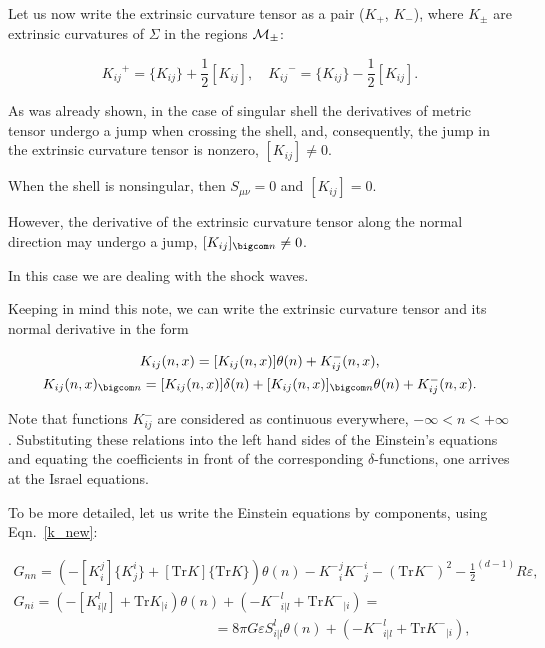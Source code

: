 Let us now write the extrinsic curvature tensor as a pair ($K_+$, $K_-$), where $K_\pm$ are extrinsic curvatures of $\Sigma$ in the regions ${\cal M}_{\pm}$:

$$

{K_{ij}}^+=\{K_{ij}\}+\frac{1}{2}[K_{ij}],

\quad 

{K_{ij}}^-=\{K_{ij}\}-\frac{1}{2}[K_{ij}].

$$

As was already shown, in the case of singular shell the derivatives of metric tensor undergo a jump when crossing the shell, and, consequently, the jump in the extrinsic curvature tensor is nonzero, $[K_{ij}] \neq 0$. 

When the shell is nonsingular, then $S_{\mu\nu}=0$ and $[K_{ij}] = 0$. 

However, the derivative of the extrinsic curvature tensor along the normal direction may undergo a jump, $[K_{ij}]_{\bigcom n} \neq 0$. 

In this case we are dealing with the shock waves.



Keeping in mind this note, we can write the extrinsic curvature tensor and its normal derivative in the form

\begin{gather}

\label{k_new}

K_{ij}(n,x) = [K_{ij}(n,x)]\theta(n)+K^-_{ij}(n,x),\\

K_{ij}(n,x)_{\bigcom n} = [K_{ij}(n,x)]\delta(n)+[K_{ij}(n,x)]_{\bigcom n}\theta(n)+K^-_{ij}(n,x).

\end{gather}

Note that functions $K^-_{ij}$ are considered as continuous everywhere, ${-\infty {<}n{<}+\infty}$. Substituting these relations into the left hand sides of the Einstein's equations and  equating the coefficients in front of the corresponding $\delta$-functions, one arrives at the Israel equations.







To be more detailed, let us write the Einstein equations by components, using Eqn.~\eqref{k_new}:

\begin{gather}

G_{nn} = (-[K_i^j]\{K_j^i\}+[\mbox{Tr}K]\{\mbox{Tr}K\})\theta(n)- {K^-}_i^j {K^-}_j^i -(\mbox{Tr}{K^-})^2- \frac{1}{2} ^{(d-1)}R\varepsilon,\\

G_{ni} = (-[K^l_{i|l}]+\mbox{Tr}K_{|i})\theta(n) + (-{K^-}^l_{i|l}+\mbox{Tr}{K^-}_{|i}) = \hspace{4cm}\\

\hspace{6cm} = 8\pi G \varepsilon S^l_{i|l}\theta(n)+(-{K^-}^l_{i|l}+\mbox{Tr}{K^-}_{|i}),

\end{gather} \pagebreak

